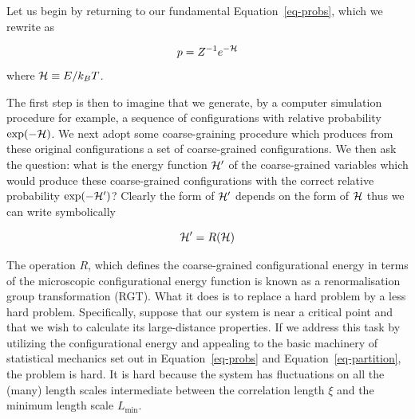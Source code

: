\documentclass[
  letterpaper,
  enabledeprecatedfontcommands]{report}
\begin{document}
\begin{tcolorbox}[enhanced jigsaw, toprule=.15mm, opacityback=0, colbacktitle=quarto-callout-caution-color!10!white, title=\textcolor{quarto-callout-caution-color}{\faFire}\hspace{0.5em}{Notes for those interested in a different perspective on RG theory.}, leftrule=.75mm, rightrule=.15mm, bottomtitle=1mm, breakable, colframe=quarto-callout-caution-color-frame, colback=white, toptitle=1mm, left=2mm, titlerule=0mm, coltitle=black, arc=.35mm, bottomrule=.15mm, opacitybacktitle=0.6]

Let us begin by returning to our fundamental Equation~\ref{eq-probs},
which we rewrite as

\[p = Z^{-1}e^{-{\cal H}}\] where \({\cal H}\equiv E/k_BT\).

The first step is then to imagine that we generate, by a computer
simulation procedure for example, a sequence of configurations with
relative probability \(\exp(-{\cal H})\). We next adopt some
coarse-graining procedure which produces from these original
configurations a set of coarse-grained configurations. We then ask the
question: what is the energy function \({\cal H}^\prime\) of the
coarse-grained variables which would produce these coarse-grained
configurations with the correct relative probability
\(\exp(-{\cal H}^\prime)\)? Clearly the form of \({\cal H}^\prime\)
depends on the form of \({\cal H}\) thus we can write symbolically

\[{\cal H}^\prime=R({\cal H})\]

The operation \(R\), which defines the coarse-grained configurational
energy in terms of the microscopic configurational energy function is
known as a renormalisation group transformation (RGT). What it does is
to replace a hard problem by a less hard problem. Specifically, suppose
that our system is near a critical point and that we wish to calculate
its large-distance properties. If we address this task by utilizing the
configurational energy and appealing to the basic machinery of
statistical mechanics set out in Equation~\ref{eq-probs} and
Equation~\ref{eq-partition}, the problem is hard. It is hard because the
system has fluctuations on all the (many) length scales intermediate
between the correlation length \(\xi\) and the minimum length scale
\(L_\textrm{min}\).


\end{tcolorbox}
\end{document}
